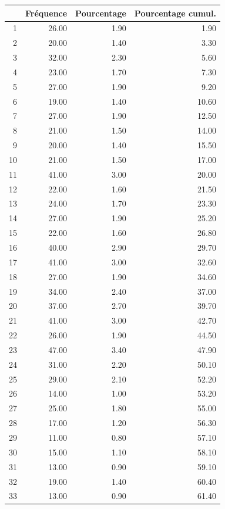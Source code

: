 \documentclass[12pt,english,french,twoside]{book}\usepackage[]{graphicx}\usepackage[]{color}
\begin{document}
\begin{table}[ht]
\centering
\begin{tabular}{rrrr}
  \hline
 & Fréquence & Pourcentage & Pourcentage cumul. \\ 
  \hline
1 & 26.00 & 1.90 & 1.90 \\ 
  2 & 20.00 & 1.40 & 3.30 \\ 
  3 & 32.00 & 2.30 & 5.60 \\ 
  4 & 23.00 & 1.70 & 7.30 \\ 
  5 & 27.00 & 1.90 & 9.20 \\ 
  6 & 19.00 & 1.40 & 10.60 \\ 
  7 & 27.00 & 1.90 & 12.50 \\ 
  8 & 21.00 & 1.50 & 14.00 \\ 
  9 & 20.00 & 1.40 & 15.50 \\ 
  10 & 21.00 & 1.50 & 17.00 \\ 
  11 & 41.00 & 3.00 & 20.00 \\ 
  12 & 22.00 & 1.60 & 21.50 \\ 
  13 & 24.00 & 1.70 & 23.30 \\ 
  14 & 27.00 & 1.90 & 25.20 \\ 
  15 & 22.00 & 1.60 & 26.80 \\ 
  16 & 40.00 & 2.90 & 29.70 \\ 
  17 & 41.00 & 3.00 & 32.60 \\ 
  18 & 27.00 & 1.90 & 34.60 \\ 
  19 & 34.00 & 2.40 & 37.00 \\ 
  20 & 37.00 & 2.70 & 39.70 \\ 
  21 & 41.00 & 3.00 & 42.70 \\ 
  22 & 26.00 & 1.90 & 44.50 \\ 
  23 & 47.00 & 3.40 & 47.90 \\ 
  24 & 31.00 & 2.20 & 50.10 \\ 
  25 & 29.00 & 2.10 & 52.20 \\ 
  26 & 14.00 & 1.00 & 53.20 \\ 
  27 & 25.00 & 1.80 & 55.00 \\ 
  28 & 17.00 & 1.20 & 56.30 \\ 
  29 & 11.00 & 0.80 & 57.10 \\ 
  30 & 15.00 & 1.10 & 58.10 \\ 
  31 & 13.00 & 0.90 & 59.10 \\ 
  32 & 19.00 & 1.40 & 60.40 \\ 
  33 & 13.00 & 0.90 & 61.40 \\ 

\end{tabular}
\end{table}
\end{document}
